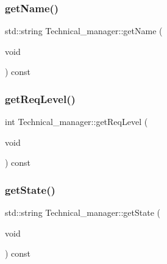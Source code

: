 \hypertarget{class_technical__manager_a716f0b2db9fa5c134d1f6c08e671ef23}{}\label{class_technical__manager_a716f0b2db9fa5c134d1f6c08e671ef23} 
\subsubsection{\texorpdfstring{get\+Name()}{getName()}}
{\footnotesize\ttfamily std\+::string Technical\+\_\+manager\+::get\+Name (\begin{DoxyParamCaption}\item[{void}]{ }\end{DoxyParamCaption}) const\hspace{0.3cm}{\ttfamily [inline]}}

\hypertarget{class_technical__manager_a301a2d7df8a8762bf416ea16c34ae8a4}{}\label{class_technical__manager_a301a2d7df8a8762bf416ea16c34ae8a4} 
\subsubsection{\texorpdfstring{get\+Req\+Level()}{getReqLevel()}}
{\footnotesize\ttfamily int Technical\+\_\+manager\+::get\+Req\+Level (\begin{DoxyParamCaption}\item[{void}]{ }\end{DoxyParamCaption}) const\hspace{0.3cm}{\ttfamily [inline]}}

\hypertarget{class_technical__manager_a908f8c89d84683b1fdd333a5efc64303}{}\label{class_technical__manager_a908f8c89d84683b1fdd333a5efc64303} 
\subsubsection{\texorpdfstring{get\+State()}{getState()}}
{\footnotesize\ttfamily std\+::string Technical\+\_\+manager\+::get\+State (\begin{DoxyParamCaption}\item[{void}]{ }\end{DoxyParamCaption}) const\hspace{0.3cm}{\ttfamily [inline]}}

